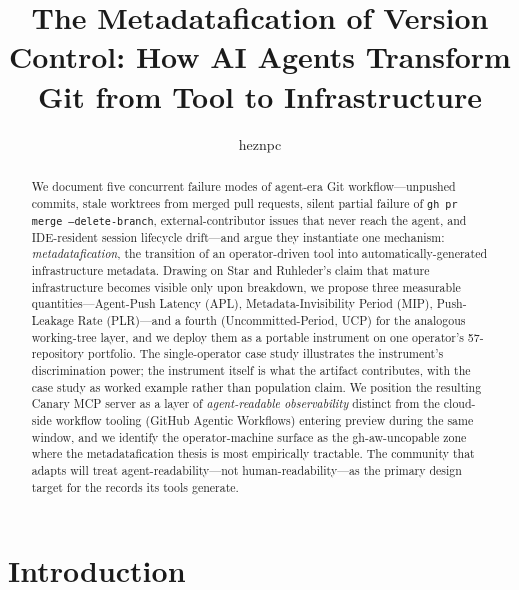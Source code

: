 \documentclass[sigconf, nonacm, anonymous=false]{acmart}
\title{The Metadatafication of Version Control: How AI Agents Transform Git from Tool to Infrastructure}
\author{heznpc}
\affiliation{%
  \institution{Independent}
  \country{Korea}
}
\begin{document}
\begin{abstract}
We document five concurrent failure modes of agent-era Git workflow---unpushed commits, stale worktrees from merged pull requests, silent partial failure of \texttt{gh pr merge --delete-branch}, external-contributor issues that never reach the agent, and IDE-resident session lifecycle drift---and argue they instantiate one mechanism: \textit{metadatafication}, the transition of an operator-driven tool into automatically-generated infrastructure metadata. Drawing on Star and Ruhleder's claim that mature infrastructure becomes visible only upon breakdown, we propose three measurable quantities---Agent-Push Latency (APL), Metadata-Invisibility Period (MIP), Push-Leakage Rate (PLR)---and a fourth (Uncommitted-Period, UCP) for the analogous working-tree layer, and we deploy them as a portable instrument on one operator's 57-repository portfolio. The single-operator case study illustrates the instrument's discrimination power; the instrument itself is what the artifact contributes, with the case study as worked example rather than population claim. We position the resulting Canary MCP server as a layer of \textit{agent-readable observability} distinct from the cloud-side workflow tooling (GitHub Agentic Workflows) entering preview during the same window, and we identify the operator-machine surface as the gh-aw-uncopable zone where the metadatafication thesis is most empirically tractable. The community that adapts will treat agent-readability---not human-readability---as the primary design target for the records its tools generate.
\end{abstract}

\maketitle

\section{Introduction}
\end{document}

